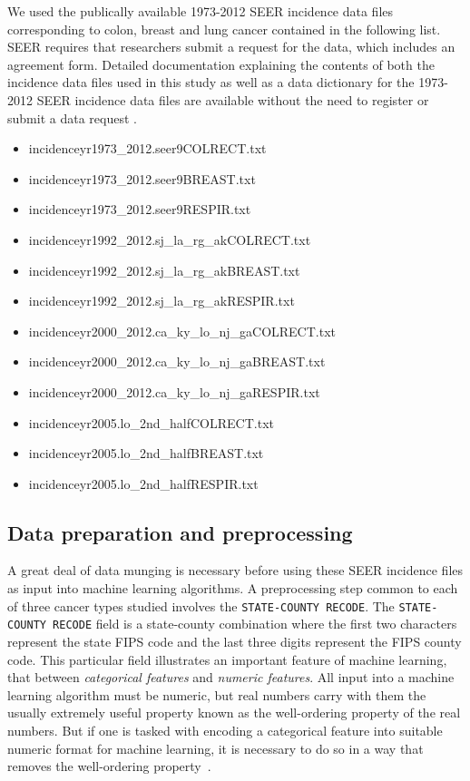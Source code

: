 \documentclass[a4paper,11pt]{article}
\newcommand{\codewhite}[1]{\colorbox{white}{\texttt{#1}}}
\begin{document}
We used the publically available 1973-2012 SEER incidence data files corresponding to colon, breast and lung cancer contained in the following list.
SEER requires that researchers submit a request for the data, which includes an agreement form. Detailed documentation explaining the contents of both the incidence data files used in this study as well as a data dictionary for the 1973-2012 SEER incidence data files are available without the need to register or submit a data request \cite{seerdoc}.
 

\begin{itemize}[noitemsep]
\item incidenceyr1973\_2012.seer9COLRECT.txt
\item incidenceyr1973\_2012.seer9BREAST.txt
\item incidenceyr1973\_2012.seer9RESPIR.txt
\item incidenceyr1992\_2012.sj\_la\_rg\_akCOLRECT.txt
\item incidenceyr1992\_2012.sj\_la\_rg\_akBREAST.txt
\item incidenceyr1992\_2012.sj\_la\_rg\_akRESPIR.txt
\item incidenceyr2000\_2012.ca\_ky\_lo\_nj\_gaCOLRECT.txt
\item incidenceyr2000\_2012.ca\_ky\_lo\_nj\_gaBREAST.txt
\item incidenceyr2000\_2012.ca\_ky\_lo\_nj\_gaRESPIR.txt
\item incidenceyr2005.lo\_2nd\_halfCOLRECT.txt
\item incidenceyr2005.lo\_2nd\_halfBREAST.txt
\item incidenceyr2005.lo\_2nd\_halfRESPIR.txt
\end{itemize}



\subsection{Data preparation and preprocessing}
\label{subsec:dataprep}

A great deal of data munging is necessary before using these SEER incidence files as input into machine learning algorithms. A preprocessing step common to each of three cancer types studied involves the \codewhite{STATE-COUNTY RECODE}.
The \codewhite{STATE-COUNTY RECODE} field is a state-county combination where the first two characters represent the state FIPS code and the last three digits represent the FIPS county code.  
This particular field illustrates an important feature of machine learning, that between \textit{categorical features} and \textit{numeric features}. All input into a machine learning algorithm must be numeric, but real numbers carry with them the usually extremely useful property known as the well-ordering property of the real numbers. But if one is tasked with encoding a categorical feature into suitable numeric format for machine learning, it is necessary to do so in a way that removes the well-ordering property~\cite{bowles}. 
\end{document}
